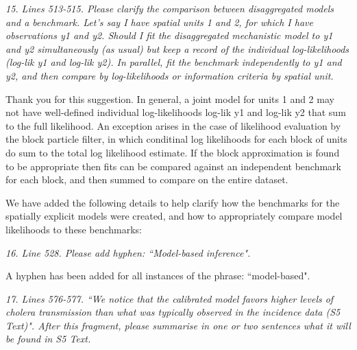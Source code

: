 \documentclass[11pt]{article}
\newcommand\report[1]{{\color{mygreen} \vspace{1mm}\hspace{0.25in}\parbox{6in}{\em #1}}}
\newcommand\article[1]{{\color{blue} \vspace{1mm}\hspace{0.25in}\parbox{6in}{\em #1}}}
\begin{document}
\report{
  15. Lines 513-515. Please clarify the comparison between disaggregated models and a benchmark. Let’s say I have spatial units 1 and 2, for which I have observations y1 and y2. Should I fit the disaggregated mechanistic model to y1 and y2 simultaneously (as usual) but keep a record of the individual log-likelihoods (log-lik y1 and log-lik y2). In parallel, fit the benchmark independently to y1 and y2, and then compare by log-likelihoods or information criteria by spatial unit.
}

Thank you for this suggestion.
In general, a joint model for units 1 and 2 may not have well-defined individual log-likelihoods log-lik y1 and log-lik y2 that sum to the full likelihood.
An exception arises in the case of likelihood evaluation by the block particle filter, in which conditinal log likelihoods for each block of units do sum to the total log likelihood estimate.
If the block approximation is found to be appropriate \cite{ionides21,ionides22} then fits can be compared against an independent benchmark for each block, and then summed to compare on the entire dataset.

We have added the following details to help clarify how the benchmarks for the spatially explicit models were created, and how to appropriately compare model likelihoods to these benchmarks:

\article{\editSpatBench}


\report{
  16. Line 528. Please add hyphen: ``Model-based inference".
}

A hyphen has been added for all instances of the phrase: ``model-based".

\report{
  17. Lines 576-577. ``We notice that the calibrated model favors higher levels of cholera transmission than what was typically observed in the incidence data (S5 Text)". After this fragment, please summarise in one or two sentences what it will be found in S5 Text.
}



\end{document}
